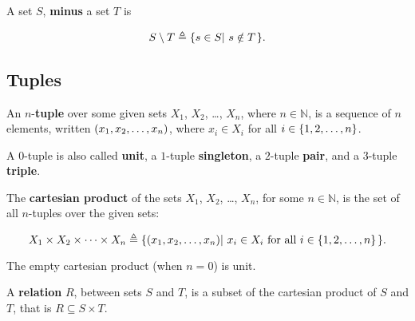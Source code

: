 \begin{definition} A set $S$, \textbf{minus} a set $T$ is

$$S\setminus T \triangleq \mathopen{}\left\{{s\in S\mathopen{}\left|\ {s\notin T}\right.\mathclose{}}\right\}\mathclose{}.$$

\end{definition}

\subsection{Tuples}

\begin{definition} An $n$-\textbf{tuple} over some given sets $X_1$, $X_2$,
\ldots, $X_n$, where $n\in\mathbb{N}$, is a sequence of $n$ elements, written
$\mathopen{}\left({x_1,x_2,\ldots,x_n}\right)\mathclose{}$, where $x_i\in X_i$ for all $i\in\mathopen{}\left\{{1,2,\ldots, n}\right\}\mathclose{}$.
\end{definition}

\begin{definition} A $0$-tuple is also called \textbf{unit}, a $1$-tuple
\textbf{singleton}, a $2$-tuple \textbf{pair}, and a 3-tuple \textbf{triple}.
\end{definition}

\begin{definition} The \textbf{cartesian product} of the sets $X_1$, $X_2$,
\ldots, $X_n$, for some $n\in\mathbb{N}$, is the set of all $n$-tuples over the
given sets:

$$X_1\times X_2\times \cdots \times X_n \triangleq
\mathopen{}\left\{{\mathopen{}\left({x_1,x_2,\ldots,x_n}\right)\mathclose{}\mathopen{}\left|\ { \text{$x_i\in X_i$ for all
$i\in\mathopen{}\left\{{1,2,\ldots, n}\right\}\mathclose{}$}}\right.\mathclose{}}\right\}\mathclose{}.$$

\end{definition}

\begin{remark} The empty cartesian product (when $n=0$) is unit. \end{remark} 


\begin{definition} A \textbf{relation} $R$, between sets $S$ and $T$, is a
subset of the cartesian product of $S$ and $T$, that is $R \subseteq S\times
T$. \end{definition}


